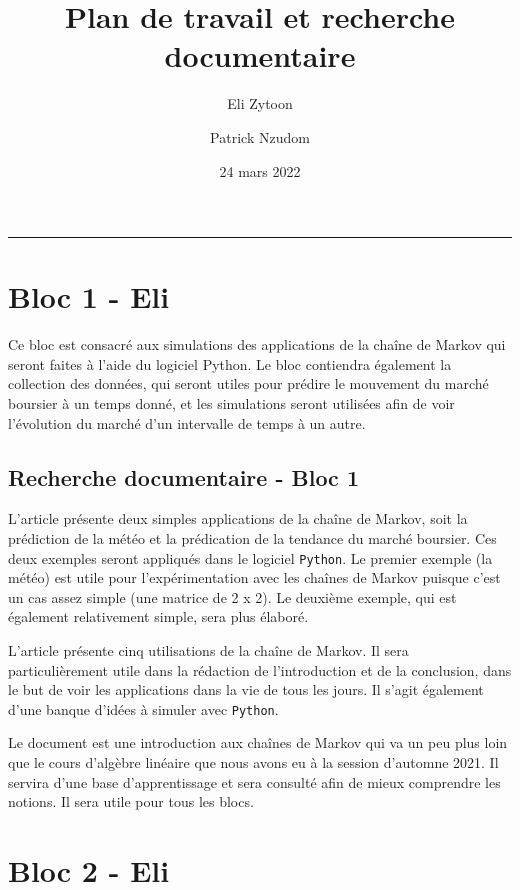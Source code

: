 \documentclass[10pt]{article}
\author{	
     Eli Zytoon
     \and
   Patrick Nzudom
     }
\title{Plan de travail et recherche documentaire}
\date{24 mars 2022}
\begin{document}
\maketitle

\rule{\linewidth}{.5pt}

\tableofcontents

\section{Bloc 1 - Eli}

Ce bloc est consacré aux simulations des applications de la chaîne de Markov qui seront faites à l’aide du logiciel Python. Le bloc contiendra également la collection des données, qui seront utiles pour prédire le mouvement du marché boursier à un temps donné, et les simulations seront utilisées afin de voir l’évolution du marché d’un intervalle de temps à un autre. 

\subsection{Recherche documentaire - Bloc 1}

L'article \cite{introductionEnAnglais} présente deux simples applications de la chaîne de Markov, soit la prédiction de la météo et la prédication de la tendance du marché boursier. Ces deux exemples seront appliqués dans le logiciel \texttt{Python}. Le premier exemple (la météo) est utile pour l'expérimentation avec les chaînes de Markov puisque c'est un cas assez simple (une matrice de 2 x 2). Le deuxième exemple, qui est également relativement simple, sera plus élaboré.

L'article \cite{realWorldUses} présente cinq utilisations de la chaîne de Markov. Il sera particulièrement utile dans la rédaction de l'introduction et de la conclusion, dans le but de voir les applications dans la vie de tous les jours. Il s'agit également d'une banque d'idées à simuler avec \texttt{Python}.

Le document \cite{baseInformation} est une introduction aux chaînes de Markov qui va un peu plus loin que le cours d’algèbre linéaire que nous avons eu à la session d’automne 2021.  Il servira d’une base d’apprentissage et sera consulté afin de mieux comprendre les notions. Il sera utile pour tous les blocs. 

\section{Bloc 2 - Eli}
\end{document}
